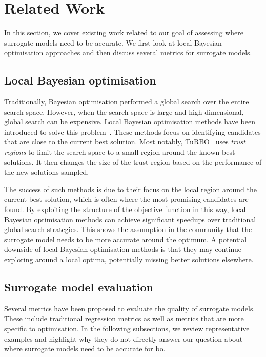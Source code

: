 \section{Related Work}
In this section, we cover existing work related to our goal of assessing where surrogate models need to be accurate. We first look at local Bayesian optimisation approaches and then discuss several metrics for surrogate models.

\subsection{Local Bayesian optimisation}
Traditionally, Bayesian optimisation performed a global search over the entire search space. However, when the search space is large and high-dimensional, global search can be expensive. Local Bayesian optimisation methods have been introduced to solve this problem~\citep{EriEtAl2019,NguEtAl22,PapEtAl2022}. 
These methods focus on identifying candidates that are close to the current best 
solution. Most notably, TuRBO~\citep{EriEtAl2019} uses \textit{trust regions} to limit the search space to a small region around the known best solutions. It then changes the size of the trust region based on the performance of the new solutions sampled. 

The success of such methods is due to their focus on the local region around the current best solution, which is often where the most promising candidates are found. By exploiting the structure of the objective function in this way, local Bayesian optimisation methods can achieve significant speedups over traditional global search strategies. This shows the assumption in the community that the surrogate model needs to be more accurate around the optimum.
A potential downside of local Bayesian optimisation methods is that they may continue exploring around a local optima, potentially missing better solutions elsewhere.

\subsection{Surrogate model evaluation}
Several metrics have been proposed to evaluate the quality of surrogate models. These include traditional regression metrics as well as metrics that are more specific to optimisation. In the following subsections, we review representative examples and highlight why they do not directly answer our question about where surrogate models need to be accurate for \gls{bo}.

